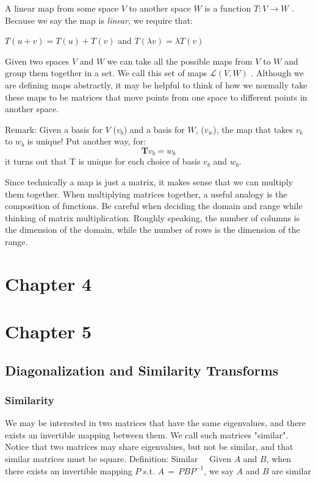 \documentclass{book}
\begin{document}
   A linear map from some space $V$ to another space $W$ is a function $T:V \rightarrow W$ . Because we say the map is \textit{linear}, we require that:

$ T(u + v) = T(u) + T(v) $ and $ T( \lambda v) = \lambda T(v) $

    Given two spaces $V$ and $W$ we can take all the possible maps from $V$ to $W$ and group them together in a set. We call this set of maps $\mathcal{L}(V,W)$ . Although we are defining maps abstractly, it may be helpful to think of how we normally take these maps to be matrices that move points from one space to different points in another space. 

Remark:
    Given a basis for $V$ ($v_b$) and a basis for $W$, ($v_w$), the map that takes $v_b$ to $w_b$ is unique! Put another way, for: $$ \pmb{T}v_b=w_b$$ it turns out that T is unique for each choice of basis $v_b$ and $w_b$.

    Since technically a map is just a matrix, it makes sense that we can multiply them together. When multiplying matrices together, a useful analogy is the composition of functions. Be careful when deciding the domain and range while thinking of matrix multiplication. Roughly speaking, the number of columns is the dimension of the domain, while the number of rows is the dimension of the range.


\chapter{Chapter 4}

\chapter{Chapter 5}
\section{Diagonalization and Similarity Transforms}
\subsection{Similarity}

    We may be interested in two matrices that have the same eigenvalues, and there exists an invertible mapping between them. We call such matrices "similar". Notice that two matrices may share eigenvalues, but not be similar, and that similar matrices must be square.
Definition: Similar
$\quad$Given $A$ and $B$, when there exists an invertible mapping $P$ s.t. $A\,=\,PBP^{-1}$, we say $A$ and $B$ are similar
\end{document}
